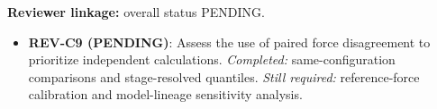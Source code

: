 \textbf{Reviewer linkage:} overall status PENDING.
\begin{itemize}[leftmargin=1.4em,noitemsep]
\item \textbf{REV-C9 (PENDING)}: Assess the use of paired force disagreement to prioritize independent calculations. \emph{Completed:} same-configuration comparisons and stage-resolved quantiles. \emph{Still required:} reference-force calibration and model-lineage sensitivity analysis.
\end{itemize}
